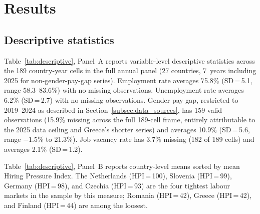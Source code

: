 \documentclass[12pt,a4paper]{article}
\begin{document}
\section{Results}
\label{sec:results}

\subsection{Descriptive statistics}
\label{subsec:descriptive}

Table~\ref{tab:descriptive}, Panel~A reports variable-level descriptive
statistics across the 189 country-year cells in the full annual panel (27
countries, 7~years including 2025 for non-gender-pay-gap series).  Employment
rate averages 75.8\% (SD\,=\,5.1, range 58.3--83.6\%) with no missing
observations.  Unemployment rate averages 6.2\% (SD\,=\,2.7) with no missing
observations.  Gender pay gap, restricted to 2019--2024 as described in
Section~\ref{subsec:data_sources}, has 159 valid observations (15.9\% missing
across the full 189-cell frame, entirely attributable to the 2025 data ceiling
and Greece's shorter series) and averages 10.9\% (SD\,=\,5.6, range $-1.5$\% to
21.3\%).  Job vacancy rate has 3.7\% missing (182 of 189 cells) and averages
2.1\% (SD\,=\,1.2).

Table~\ref{tab:descriptive}, Panel~B reports country-level means sorted by mean
Hiring Pressure Index.  The Netherlands (HPI\,=\,100), Slovenia (HPI\,=\,99),
Germany (HPI\,=\,98), and Czechia (HPI\,=\,93) are the four tightest labour
markets in the sample by this measure; Romania (HPI\,=\,42), Greece (HPI\,=\,42),
and Finland (HPI\,=\,44) are among the loosest.
\end{document}
